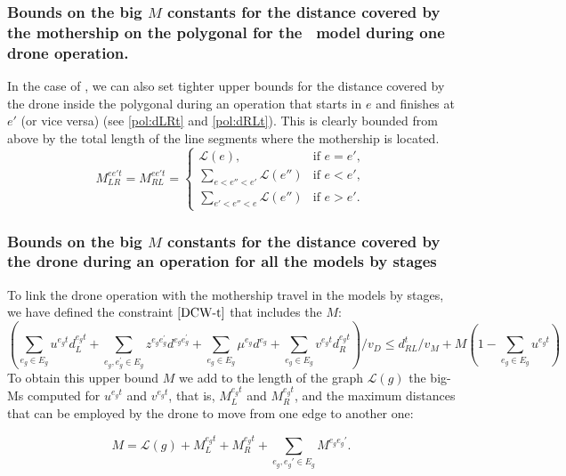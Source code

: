\subsubsection*{Bounds on the big $M$ constants for the distance covered by the mothership on the polygonal for the \PMD \ model during one drone operation.}
In the case of \PMD, we can also set tighter upper bounds for the distance covered by the drone inside the polygonal during an operation that starts in $e$ and finishes at $e'$ (or vice versa) (see \eqref{pol:dLRt} and \eqref{pol:dRLt}). This is clearly bounded from above by the total length of the line segments where the mothership is located. 
\begin{equation*}
M_{LR}^{ee't} = M_{RL}^{ee't} = \left\{\begin{matrix}
\mathcal L(e), & \text{if } e = e',\\ 
\displaystyle \sum_{e<e''<e'}\mathcal L(e'') & \text{if } e < e', \\
\displaystyle \sum_{e'<e''<e}\mathcal L(e'') & \text{if } e > e'.
\end{matrix}\right.
\end{equation*}


\subsubsection*{Bounds on the big $M$ constants for the distance covered by the drone during an operation for all the models by stages}
To link the drone operation with the mothership travel in the models by stages, we have defined the constraint $\eqref{DCW-t}$ that includes the $M$:
\begin{equation*}
\left(\sum_{e_g\in E_g} u^{e_gt}d_L^{e_gt} + \sum_{e_g, e^\prime_g\in E_g}z^{e_ge^\prime_g}d^{e_ge^\prime_g} + \sum_{e_g\in E_g} \mu^{e_g}d^{e_g} + \sum_{e_g\in E_g} v^{e_gt}d_R^{e_gt}\right)/v_D \leq d_{RL}^t/v_M + M(1 - \sum_{e_g\in E_g} u^{e_gt})
\end{equation*}
\noindent
To obtain this upper bound $M$ we add to the length of the graph $\mathcal L(g)$ the big-Ms computed for $u^{e_gt}$ and $v^{e_gt}$, that is, $M_{L}^{e_gt}$ and $M_R^{e_gt}$, and the maximum distances that can be employed by the drone to move from one edge to another one:

$$M = \mathcal{L}(g) + M_L^{e_gt} + M_R^{e_gt} + \sum_{e_g, e_g'\in E_g}M^{e_ge_g'}.$$

